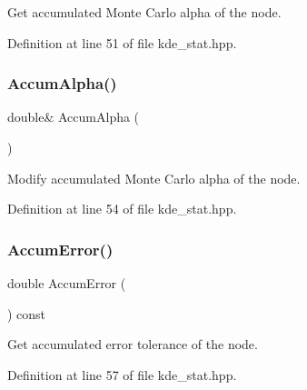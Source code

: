 Get accumulated Monte Carlo alpha of the node. 



Definition at line 51 of file kde\+\_\+stat.\+hpp.

\mbox{\label{classmlpack_1_1kde_1_1KDEStat_aad708d8c87d9b3c99eb9c5b3dd8daca0}} 
\subsubsection{Accum\+Alpha()\hspace{0.1cm}{\footnotesize\ttfamily [2/2]}}
{\footnotesize\ttfamily double\& Accum\+Alpha (\begin{DoxyParamCaption}{ }\end{DoxyParamCaption})\hspace{0.3cm}{\ttfamily [inline]}}



Modify accumulated Monte Carlo alpha of the node. 



Definition at line 54 of file kde\+\_\+stat.\+hpp.

\mbox{\label{classmlpack_1_1kde_1_1KDEStat_a4b14a5b766c31f255c9e540cd8c34e26}} 
\subsubsection{Accum\+Error()\hspace{0.1cm}{\footnotesize\ttfamily [1/2]}}
{\footnotesize\ttfamily double Accum\+Error (\begin{DoxyParamCaption}{ }\end{DoxyParamCaption}) const\hspace{0.3cm}{\ttfamily [inline]}}



Get accumulated error tolerance of the node. 



Definition at line 57 of file kde\+\_\+stat.\+hpp.

\mbox{\label{classmlpack_1_1kde_1_1KDEStat_a0d4ba0b1d3b68be5db83e8fa87fefa0d}} 
